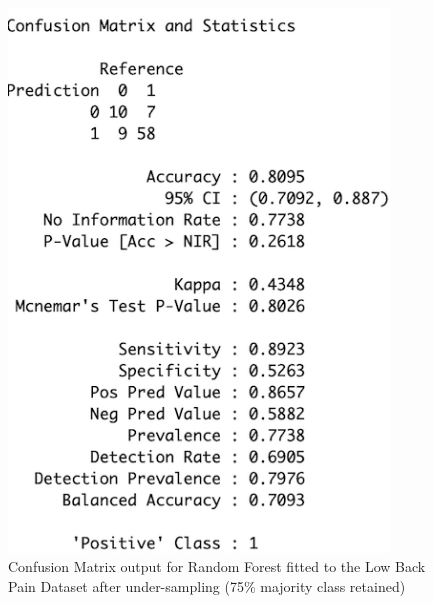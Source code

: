 \begin{figure}[!htbp]
    \centering
    \begin{minipage}{0.45\textwidth}
        \centering
        \includegraphics[width=0.9\textwidth]{ThesisTemplate/appendix/images/Chapter5Appendix/ConfusionMatrix75/LBP.png}
        \caption{Confusion Matrix output for Random Forest fitted to the Low Back Pain Dataset after under-sampling (75\% majority class retained)}
        \label{fig:matrixLBP75}
    \end{minipage}\hfill
    \begin{minipage}{0.45\textwidth}
        \centering

\end{minipage}
\end{figure}
